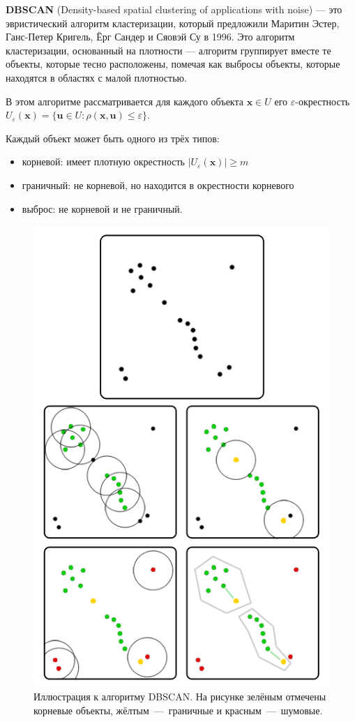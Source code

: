 \documentclass[10pt]{article}
\renewcommand{\leq}{\leqslant}
\renewcommand{\geq}{\geqslant}
\begin{document}
\textbf{DBSCAN} (Density-based spatial clustering of applications with noise) --- это эвристический алгоритм кластеризации, который предложили Маритин Эстер, Ганс-Петер Кригель, Ёрг Сандер и Сяовэй Су в 1996. Это алгоритм кластеризации, основанный на плотности --- алгоритм группирует вместе те объекты, которые тесно расположены, помечая как выбросы объекты, которые находятся в областях с малой плотностью.

	
В этом алгоритме рассматривается для каждого объекта $\pmb x \in U$ его $\varepsilon$-окрестность $U_\varepsilon (\pmb x) = \{\pmb u \in U : \rho(\pmb x , \pmb u ) \leq \varepsilon\}$.
	
Каждый объект может быть одного из трёх типов:
	\begin{itemize}
		\item корневой: имеет плотную окрестность $|U_\varepsilon (\pmb x)| \geq m$ 
		\item граничный: не корневой, но находится в окрестности корневого 
		\item выброс: не корневой и не граничный. 
	\end{itemize}

\begin{figure}[H]
	\begin{center}
		\includegraphics[scale = 1.5]{dbscan.png}
		\caption{Иллюстрация к алгоритму DBSCAN. На рисунке зелёным отмечены корневые объекты, жёлтым~---~граничные и красным~---~шумовые.}
	\end{center}
\end{figure}
	
\end{document}
